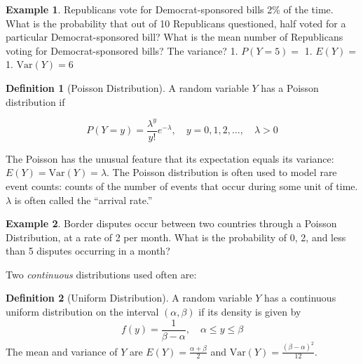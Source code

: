 \documentclass[
]{book}
\theoremstyle{definition}
\newtheorem{definition}{Definition}[chapter]
\theoremstyle{definition}
\newtheorem{example}{Example}[chapter]
\theoremstyle{definition}
\theoremstyle{definition}
\theoremstyle{remark}
\begin{document}
\begin{example}
\protect\hypertarget{exm:unnamed-chunk-275}{}{\label{exm:unnamed-chunk-275} }Republicans vote for Democrat-sponsored bills 2\% of the time. What is the probability that out of 10 Republicans questioned, half voted for a particular Democrat-sponsored bill? What is the mean number of Republicans voting for Democrat-sponsored bills? The variance?
1. \(P(Y=5)=\)
1. \(E(Y)=\)
1. \(\text{Var}(Y)=6\)
\end{example}

\begin{definition}[Poisson Distribution]
\protect\hypertarget{def:unnamed-chunk-276}{}{\label{def:unnamed-chunk-276} {} }A random variable \(Y\) has a Poisson distribution if

\[P(Y = y)=\frac{\lambda^y}{y!}e^{-\lambda}, \quad y=0,1,2,\ldots, \quad \lambda>0\]

The Poisson has the unusual feature that its expectation equals its variance: \(E(Y)=\text{Var}(Y)=\lambda\). The Poisson distribution is often used to model rare event counts: counts of the number of events that occur during some unit of time. \(\lambda\) is often called the ``arrival rate.''
\end{definition}

\begin{example}
\protect\hypertarget{exm:unnamed-chunk-277}{}{\label{exm:unnamed-chunk-277} }Border disputes occur between two countries through a Poisson Distribution, at a rate of 2 per month. What is the probability of 0, 2, and less than 5 disputes occurring in a month?
\end{example}

Two \emph{continuous} distributions used often are:

\begin{definition}[Uniform Distribution]
\protect\hypertarget{def:unnamed-chunk-278}{}{\label{def:unnamed-chunk-278} {} }A random variable \(Y\) has a continuous uniform distribution on the interval \((\alpha,\beta)\) if its density is given by \[f(y)=\frac{1}{\beta-\alpha}, \quad \alpha\le y\le \beta\] The mean and variance of \(Y\) are \(E(Y)=\frac{\alpha+\beta}{2}\) and \(\text{Var}(Y)=\frac{(\beta-\alpha)^2}{12}\).
\end{definition}
\end{document}
